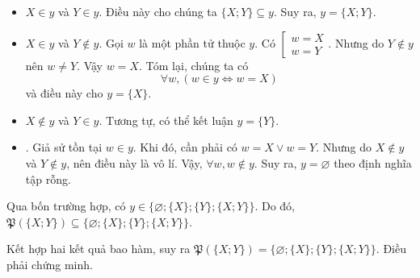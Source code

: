 \begin{itemize}
    \item \textcolor{colorEmphasis}{$X \in y$ và $Y \in y$}. Điều này cho chúng ta $\{X; Y\} \subseteq y$. Suy ra, $y = \{X; Y\}$.
    \item \textcolor{colorEmphasisCyan}{$X \in y$ và $Y \notin y$}. Gọi $w$ là một phần tử thuộc $y$. Có $\left[\begin{aligned} w = X \\ w = Y \end{aligned}\right.$. Nhưng do $Y \notin y$ nên $w \neq Y$. Vậy $w = X$. Tóm lại, chúng ta có
          $$\forall w, \left(w \in y \iff w = X\right)$$
          và điều này cho $y = \{X\}$.
    \item \textcolor{colorEmphasisGreen}{$X \notin y$ và $Y \in y$}. Tương tự, có thể kết luận $y = \{Y\}$.
    \item {}. Giả sử tồn tại $w \in y$. Khi đó, cần phải có $w = X \lor w = Y$. Nhưng do $X \notin y$ và $Y \notin y$, nên điều này là vô lí. Vậy, $\forall w, w \notin y$. Suy ra, $y = \varnothing$ theo định nghĩa tập rỗng.
\end{itemize}

Qua bốn trường hợp, có $y \in \{\varnothing; \{X\}; \{Y\}; \{X; Y\}\}$. Do đó, $\mathfrak{P}(\{X; Y\}) \subseteq \{\varnothing; \{X\}; \{Y\}; \{X; Y\}\}$.

Kết hợp hai kết quả bao hàm, suy ra $\mathfrak{P}(\{X; Y\}) = \{\varnothing; \{X\}; \{Y\}; \{X; Y\}\}$. Điều phải chứng minh.

